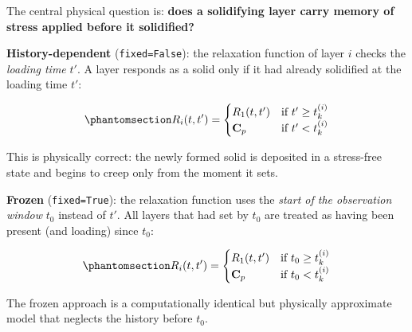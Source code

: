 \documentclass[
  a4paper,
  numbers=noendperiod,
  DIV=12]{scrreprt}
\begin{document}
The central physical question is: \textbf{does a solidifying layer carry
memory of stress applied before it solidified?}

\textbf{History-dependent} (\texttt{fixed=False}): the relaxation
function of layer \(i\) checks the \emph{loading time} \(t'\). A layer
responds as a solid only if it had already solidified at the loading
time \(t'\):

\begin{equation}\protect\phantomsection\label{eq-history-dep}{R_i(t,t') = \begin{cases} R_1(t,t') & \text{if } t' \geq t_k^{(i)} \\ \mathbf{C}_p & \text{if } t' < t_k^{(i)} \end{cases}
}\end{equation}

This is physically correct: the newly formed solid is deposited in a
stress-free state and begins to creep only from the moment it sets.

\textbf{Frozen} (\texttt{fixed=True}): the relaxation function uses the
\emph{start of the observation window} \(t_0\) instead of \(t'\). All
layers that had set by \(t_0\) are treated as having been present (and
loading) since \(t_0\):

\begin{equation}\protect\phantomsection\label{eq-frozen}{R_i(t,t') = \begin{cases} R_1(t,t') & \text{if } t_0 \geq t_k^{(i)} \\ \mathbf{C}_p & \text{if } t_0 < t_k^{(i)} \end{cases}
}\end{equation}

The frozen approach is a computationally identical but physically
approximate model that neglects the history before \(t_0\).
\end{document}

